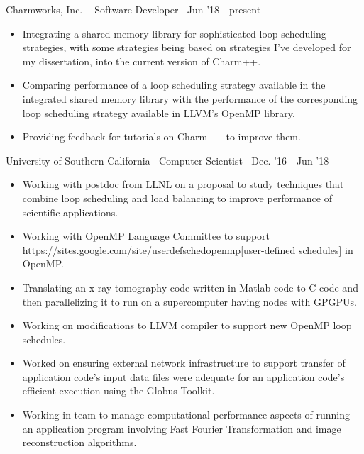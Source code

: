 {Charmworks, Inc. $\>$$\>$$\>$$\>$Software Developer$\>$$\>$$\>$$\>$Jun '18 - present}
\begin{itemize}
\item Integrating a shared memory library for sophisticated loop scheduling strategies, with some
strategies being based on strategies I’ve developed for my dissertation, into the current version
of Charm++.
\item Comparing performance of a loop scheduling strategy available in the integrated shared memory library with the performance of the corresponding loop scheduling strategy available in LLVM’s OpenMP library.
\item Providing feedback for tutorials on Charm++ to improve them.
\end{itemize} 

{University of Southern California$\>$$\>$$\>$$\>$Computer Scientist$\>$$\>$$\>$$\>$Dec. '16 - Jun '18}
\vspace*{-0.0in} 
\begin{itemize}
\item Working with postdoc from LLNL on a proposal to study
techniques that combine loop scheduling and load balancing to improve
performance of scientific applications.
\item Working with OpenMP Language Committee to support
\url{https://sites.google.com/site/userdefschedopenmp}[user-defined schedules] in OpenMP.
\item Translating an x-ray tomography code written in
Matlab code to C code and then parallelizing it to run on a supercomputer
having nodes with GPGPUs. 
\item Working on modifications to LLVM compiler to support new
OpenMP loop schedules. 
\item Worked on ensuring external network infrastructure to support transfer of application code's input data files were adequate
for an application code's efficient execution using the Globus Toolkit.
\item Working in team to manage computational performance aspects of running an application program involving Fast Fourier Transformation and image reconstruction algorithms. 
\end{itemize}

